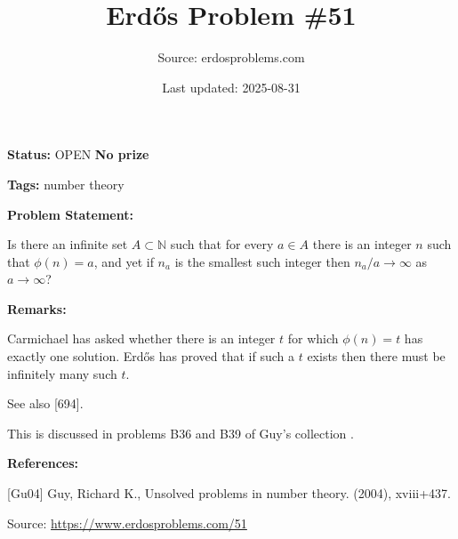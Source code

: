 \documentclass{article}
\title{Erd\H{o}s Problem \#51}
\date{Last updated: 2025-08-31}
\author{Source: erdosproblems.com}
\begin{document}
\maketitle

\noindent\textbf{Status:} OPEN \quad \textbf{No prize}

\noindent\textbf{Tags:} number theory

\medskip
\noindent\textbf{Problem Statement:}

Is there an infinite set $A\subset \mathbb{N}$ such that for every $a\in A$ there is an integer $n$ such that $\phi(n)=a$, and yet if $n_a$ is the smallest such integer then $n_a/a\to \infty$ as $a\to\infty$?

\bigskip
\noindent\textbf{Remarks:}

Carmichael has asked whether there is an integer $t$ for which $\phi(n)=t$ has exactly one solution. Erd\H{o}s has proved that if such a $t$ exists then there must be infinitely many such $t$.

See also [694].

This is discussed in problems B36 and B39 of Guy's collection \cite{Gu04}.

\bigskip
\noindent\textbf{References:}

[Gu04] Guy, Richard K., Unsolved problems in number theory. (2004), xviii+437.

\bigskip
\noindent\small{Source: \url{https://www.erdosproblems.com/51}}
\end{document}
